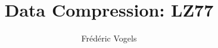 \usepackage{ucll-code}
\usepackage{siunitx}
\usepackage{ifthen}

\usetikzlibrary{positioning}

\makeatletter
\def\light@caption@on{on}
\def\light@caption@off{off}
\def\light@caption@neutral{}
\makeatother

\newcommand{\hex}[1]{\texttt{\bfseries #1}}


\title{Data Compression: LZ77}
\author{Fr\'ed\'eric Vogels}






